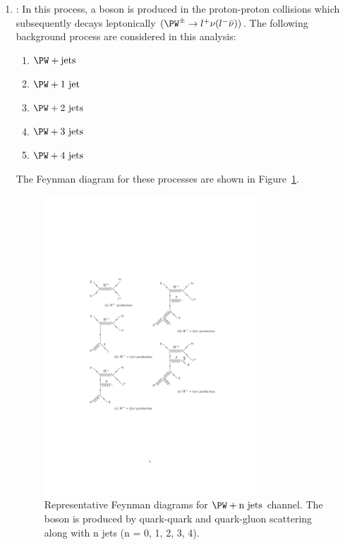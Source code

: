 \begin{enumerate}
\item {\bf{\wjets}}: In this process, a \PW boson is produced in the 
    proton-proton collisions which subsequently decays leptonically 
    $(\PW^\pm \rightarrow l^+ \nu (l^-\bar{\nu}))$. The following 
    \wjets background process are considered in this analysis:
  	\begin{enumerate}
  	  \item $\PW + \text{jets  }$
  	  \item $\PW + \text{1 jet }$
  	  \item $\PW + \text{2 jets }$
  	  \item $\PW + \text{3 jets }$
  	  \item $\PW + \text{4 jets }$
  	\end{enumerate} 
	The Feynman diagram for these processes are shown in Figure~\ref{fig:feyn_diag_wjet}.
	\begin{figure}
	\begin{center}
	\includegraphics[width=0.75\textwidth]{Image/FeynDiag/feyn_diag_wjet.pdf}
	\caption{Representative Feynman diagrams for $\PW + \text{n jets}$ channel. The 
	\PW boson is produced by quark-quark and quark-gluon scattering 
	along with n jets (n = 0, 1, 2, 3, 4).}
	\label{fig:feyn_diag_wjet}
	\end{center}
	\end{figure}


\end{enumerate}
